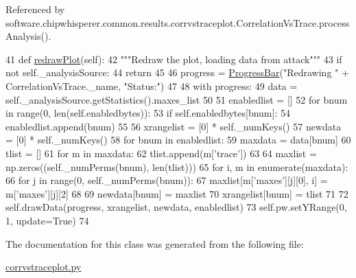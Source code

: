 Referenced by software.\+chipwhisperer.\+common.\+results.\+corrvstraceplot.\+Correlation\+Vs\+Trace.\+process\+Analysis().


\begin{DoxyCode}
41     \textcolor{keyword}{def }\hyperlink{classsoftware_1_1chipwhisperer_1_1common_1_1results_1_1corrvstraceplot_1_1CorrelationVsTrace_af204d0686ab193ad68593ff2bc18d116}{redrawPlot}(self):
42         \textcolor{stringliteral}{"""Redraw the plot, loading data from attack"""}
43         \textcolor{keywordflow}{if} \textcolor{keywordflow}{not} self.\_analysisSource:
44             \textcolor{keywordflow}{return}
45 
46         progress = \hyperlink{namespacesoftware_1_1chipwhisperer_1_1common_1_1ui_1_1ProgressBar_a378a399b50b3d116fc08a53eaa642148}{ProgressBar}(\textcolor{stringliteral}{"Redrawing "} + CorrelationVsTrace.\_name, \textcolor{stringliteral}{"Status:"})
47 
48         with progress:
49             data = self.\_analysisSource.getStatistics().maxes\_list
50 
51             enabledlist = []
52             \textcolor{keywordflow}{for} bnum \textcolor{keywordflow}{in} range(0, len(self.enabledbytes)):
53                 \textcolor{keywordflow}{if} self.enabledbytes[bnum]:
54                     enabledlist.append(bnum)
55 
56             xrangelist = [0] * self.\_numKeys()
57             newdata = [0] * self.\_numKeys()
58             \textcolor{keywordflow}{for} bnum \textcolor{keywordflow}{in} enabledlist:
59                 maxdata = data[bnum]
60                 tlist = []
61                 \textcolor{keywordflow}{for} m \textcolor{keywordflow}{in} maxdata:
62                     tlist.append(m[\textcolor{stringliteral}{'trace'}])
63 
64                 maxlist = np.zeros((self.\_numPerms(bnum), len(tlist)))
65                 \textcolor{keywordflow}{for} i, m \textcolor{keywordflow}{in} enumerate(maxdata):
66                     \textcolor{keywordflow}{for} j \textcolor{keywordflow}{in} range(0, self.\_numPerms(bnum)):
67                         maxlist[m[\textcolor{stringliteral}{'maxes'}][j][0], i] = m[\textcolor{stringliteral}{'maxes'}][j][2]
68 
69                 newdata[bnum] = maxlist
70                 xrangelist[bnum] = tlist
71 
72             self.drawData(progress, xrangelist, newdata, enabledlist)
73             self.pw.setYRange(0, 1, update=\textcolor{keyword}{True})
74 
\end{DoxyCode}


The documentation for this class was generated from the following file\+:\begin{DoxyCompactItemize}
\item 
\hyperlink{corrvstraceplot_8py}{corrvstraceplot.\+py}\end{DoxyCompactItemize}
